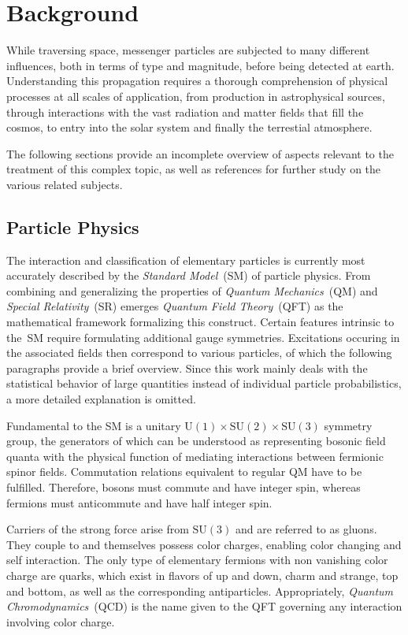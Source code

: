 \chapter{Background}
\label{ch:background}

While traversing space, messenger particles are subjected to many different influences, both in terms of type and magnitude, before being
detected at earth. Understanding this propagation requires a thorough comprehension of physical processes at all scales of application,
from production in astrophysical sources, through interactions with the vast radiation and matter fields that fill the cosmos, to entry
into the solar system and finally the terrestial atmosphere.

The following sections provide an incomplete overview of aspects relevant to the treatment of this complex topic, as well as references
for further study on the various related subjects.

\section{Particle Physics}
\label{sec:particle}

The interaction and classification of elementary particles is currently most accurately described by the \emph{Standard Model}~(SM)
of particle physics. From combining and generalizing the properties of \emph{Quantum Mechanics}~(QM) and \emph{Special Relativity}~(SR)
emerges \emph{Quantum Field Theory}~(QFT) as the mathematical framework formalizing this construct. Certain features intrinsic to the~SM
require formulating additional gauge symmetries. Excitations occuring in the associated fields then correspond to
various particles, of which the following paragraphs provide a brief overview. Since this work mainly deals with the statistical behavior
of large quantities instead of individual particle probabilistics, a more detailed explanation is omitted.

Fundamental to the SM is a unitary $\text{U}(1) \times \text{SU}(2) \times \text{SU}(3)$ symmetry group, the generators of which can be
understood as representing bosonic field quanta with the physical function of mediating interactions between fermionic spinor fields.
Commutation relations equivalent to regular QM have to be fulfilled. Therefore, bosons must commute and have integer spin, whereas
fermions must anticommute and have half integer spin.

Carriers of the strong force arise from $\text{SU}(3)$ and are referred to as gluons. They couple to and themselves possess color
charges, enabling color changing and self interaction. The only type of elementary fermions with non vanishing color charge are quarks,
which exist in flavors of up and down, charm and strange, top and bottom, as well as the corresponding antiparticles. Appropriately,
\emph{Quantum Chromodynamics}~(QCD) is the name given to the QFT governing any interaction involving color charge.

